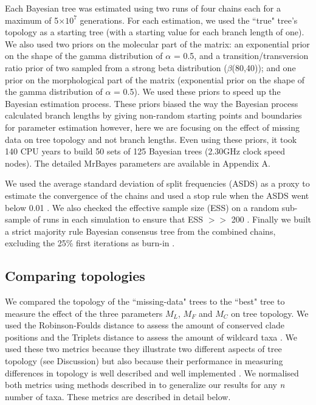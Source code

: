 \documentclass[12pt,letterpaper]{article}
\begin{document}
Each Bayesian tree was estimated using two runs of four chains each for a maximum of 5$\times$$10^7$ generations.
For each estimation, we used the ``true" tree's topology as a starting tree (with a starting value for each branch length of one).
We also used two priors on the molecular part of the matrix: an exponential prior on the shape of the gamma distribution of $\alpha$ = 0.5, and a transition/transversion ratio prior of two sampled from a strong beta distribution ($\beta$(80,40)); and one prior on the morphological part of the matrix (exponential prior on the shape of the gamma distribution of $\alpha$ = 0.5).
We used these priors to speed up the Bayesian estimation process.
These priors biased the way the Bayesian process calculated branch lengths by giving non-random starting points and boundaries for parameter estimation however, here we are focusing on the effect of missing data on tree topology and not branch lengths.
Even using these priors, it took $~$ 140 CPU years to build 50 sets of 125 Bayesian trees (2.30GHz clock speed nodes).
The detailed MrBayes parameters are available in Appendix A.

We used the average standard deviation of split frequencies (ASDS) as a proxy to estimate the convergence of the chains and used a stop rule when the ASDS went below 0.01 \citep{Ronquist2012mrbayes}.
We also checked the effective sample size (ESS) on a random sub-sample of runs in each simulation to ensure that ESS $>>$ 200 \citep{drummond2006ess}.
Finally we built a strict majority rule Bayesian consensus tree from the combined chains, excluding the 25\% first iterations as burn-in \citep{Ronquist2012mrbayes}.


\subsection{Comparing topologies}
We compared the topology of the ``missing-data" trees to the ``best" tree to measure the effect of the three parameters $M_{L}$, $M_{F}$ and $M_{C}$ on tree topology.
We used the Robinson-Foulds distance \citep{RF1981} to assess the amount of conserved clade positions and the Triplets distance \citep{dobson1975triplets} to assess the amount of wildcard taxa \citep[i.e. taxa that frequently change position in different trees][]{kearneyfragmentary2002}. We used these two metrics because they illustrate two different aspects of tree topology (see Discussion) but also because their performance in measuring differences in topology is well described \citep{Kuhner04112014} and well implemented \citep{Bogdanowicz2012}.
We normalised both metrics using methods described in \citet{Bogdanowicz2012} to generalize our results for any \textit{n} number of taxa.
These metrics are described in detail below.
\end{document}
